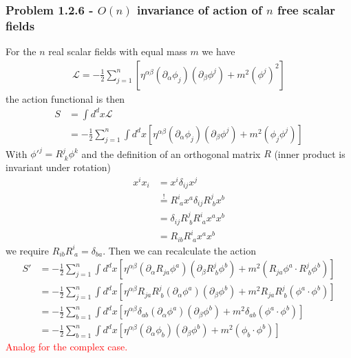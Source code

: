 \documentclass[10pt,a4paper]{article}
\theoremstyle{definition}
\begin{document}
\subsubsection{Problem 1.2.6 - \texorpdfstring{$O(n)$}{Lg} invariance of action of \texorpdfstring{$n$}{Lg} free scalar fields}
For the $n$ real scalar fields with equal mass $m$ we have
\begin{align}
    \mathcal{L}=-\frac{1}{2}\sum_{j=1}^n\left[\eta^{\alpha\beta}(\partial_\alpha\phi_j)(\partial_\beta\phi^j)+m^2(\phi^j)^2\right]
\end{align}
the action functional is then
\begin{align}
    S&=\int d^dx\mathcal{L}\\
    &=-\frac{1}{2}\sum_{j=1}^n\int d^dx\left[\eta^{\alpha\beta}(\partial_\alpha\phi_j)(\partial_\beta\phi^j)+m^2(\phi_j\phi^j)\right]
\end{align}
With $\phi'^{j}=R^j_{\;k}\phi^k$ and the definition of an orthogonal matrix $R$ (inner product is invariant under rotation)
\begin{align}
    x^ix_i&=x^i\delta_{ij}x^j\\
    &\stackrel{!}{=}R^i_{\;a}x^a\delta_{ij}R^j_{\;b}x^b\\
    &=\delta_{ij}R^j_{\;b}R^i_{\;a}x^ax^b\\
    &=R_{ib}R^i_{\;a}x^ax^b
\end{align}
we require $R_{ib}R^i_{\;a}=\delta_{ba}$. Then we can recalculate the action
\begin{align}
    S'&=-\frac{1}{2}\sum_{j=1}^n\int d^dx\left[\eta^{\alpha\beta}(\partial_\alpha R_{ja}\phi^a)(\partial_\beta R^j_{\;b}\phi^b)+m^2(R_{ja}\phi^a\cdot R^j_{\;b}\phi^b)\right]\\
    &=-\frac{1}{2}\sum_{j=1}^n\int d^dx\left[\eta^{\alpha\beta}R_{ja}R^j_{\;b}(\partial_\alpha \phi^a)(\partial_\beta \phi^b)+m^2R_{ja}R^j_{\;b}(\phi^a\cdot \phi^b)\right]\\
    &=-\frac{1}{2}\sum_{b=1}^n\int d^dx\left[\eta^{\alpha\beta}\delta_{ab}(\partial_\alpha \phi^a)(\partial_\beta \phi^b)+m^2\delta_{ab}(\phi^a\cdot \phi^b)\right]\\
    &=-\frac{1}{2}\sum_{b=1}^n\int d^dx\left[\eta^{\alpha\beta}(\partial_\alpha \phi_b)(\partial_\beta \phi^b)+m^2(\phi_b\cdot \phi^b)\right]   
\end{align}
\textcolor{red}{Analog for the complex case.}
\end{document}
